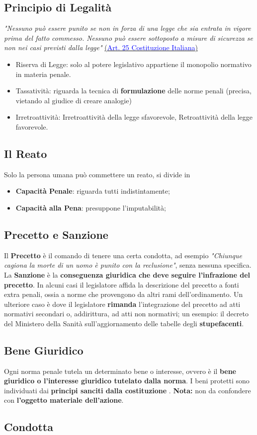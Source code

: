 \documentclass[twocolumn]{article}
\begin{document}
\subsection{Principio di Legalità}
\textit{"Nessuno può essere punito se non in forza di una legge che sia entrata in vigore prima del fatto commesso. Nessuno può essere sottoposto a misure di sicurezza se non nei casi previsti dalla legge"} \hyperlink{https://www.senato.it/istituzione/la-costituzione/parte-i/titolo-i/articolo-25}{(\textcolor{blue}{Art. 25 Costituzione Italiana})}
\begin{itemize}
    \item Riserva di Legge: solo al potere legislativo appartiene il monopolio normativo in materia penale.
    \item Tassatività: riguarda la tecnica di \textbf{formulazione} delle norme penali (precisa, vietando al giudice di creare analogie)
    \item Irretroattività: Irretroattività della legge sfavorevole, Retroattività della legge favorevole.
\end{itemize}
\subsection{Il Reato}
Solo la persona umana può commettere un reato, si divide in \begin{itemize}
    \item \textbf{Capacità Penale}: riguarda tutti indistintamente;
    \item \textbf{Capacità alla Pena}: presuppone l'imputabilità;
\end{itemize}
\subsection{Precetto e Sanzione}
Il \textbf{Precetto} è il comando di tenere una certa condotta, ad esempio \textit{"Chiunque cagiona la morte di un uomo è punito con la reclusione"}, senza nessuna specifica. La \textbf{Sanzione} è la \textbf{conseguenza giuridica che deve seguire l'infrazione del precetto}. \newline In alcuni casi il legislatore affida la descrizione del precetto a fonti extra penali, ossia a norme che provengono da altri rami dell'ordinamento. Un ulteriore caso è dove il legislatore \textbf{rimanda} l'integrazione del precetto ad atti normativi secondari o, addirittura, ad atti non normativi; un esempio: il decreto del Ministero della Sanità sull'aggiornamento delle tabelle degli \textbf{stupefacenti}.
\subsection{Bene Giuridico}
Ogni norma penale tutela un determinato bene o interesse, ovvero è il \textbf{bene giuridico o l'interesse  giuridico tutelato dalla norma}. I beni protetti sono individuati dai \textbf{principi sanciti dalla costituzione }. \textbf{Nota:} non da confondere con \textbf{l'oggetto materiale dell'azione}.
\subsection{Condotta}
\end{document}
